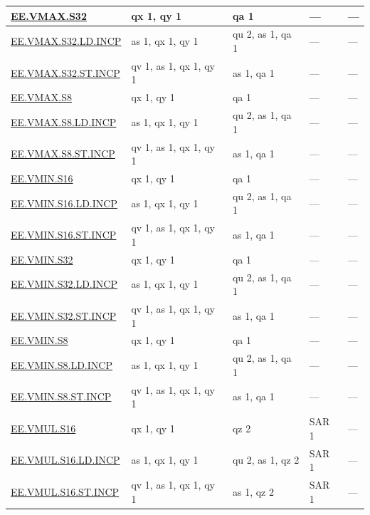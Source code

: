 \begin{longtable}[c]{|l|m{2.5cm}|m{2.5cm}|m{2.5cm}|m{2.5cm}|}
    \hyperref[instruction:EEVMAXS32]{EE.VMAX.S32} & qx 1, qy 1 & qa 1 & — & — \\\hline
    \hyperref[instruction:EEVMAXS32LDINCP]{EE.VMAX.S32.LD.INCP} & as 1, qx 1, qy 1 & qu 2, as 1, qa 1 & — & — \\\hline
    \hyperref[instruction:EEVMAXS32STINCP]{EE.VMAX.S32.ST.INCP} & qv 1, as 1, qx 1, qy 1 & as 1, qa 1 & — & — \\\hline
    \hyperref[instruction:EEVMAXS8]{EE.VMAX.S8} & qx 1, qy 1 & qa 1 & — & — \\\hline
    \hyperref[instruction:EEVMAXS8LDINCP]{EE.VMAX.S8.LD.INCP} & as 1, qx 1, qy 1 & qu 2, as 1, qa 1 & — & — \\\hline
    \hyperref[instruction:EEVMAXS8STINCP]{EE.VMAX.S8.ST.INCP} & qv 1, as 1, qx 1, qy 1 & as 1, qa 1 & — & — \\\hline
    \hyperref[instruction:EEVMINS16]{EE.VMIN.S16} & qx 1, qy 1 & qa 1 & — & — \\\hline
    \hyperref[instruction:EEVMINS16LDINCP]{EE.VMIN.S16.LD.INCP} & as 1, qx 1, qy 1 & qu 2, as 1, qa 1 & — & — \\\hline
    \hyperref[instruction:EEVMINS16STINCP]{EE.VMIN.S16.ST.INCP} & qv 1, as 1, qx 1, qy 1 & as 1, qa 1 & — & — \\\hline
    \hyperref[instruction:EEVMINS32]{EE.VMIN.S32} & qx 1, qy 1 & qa 1 & — & — \\\hline
    \hyperref[instruction:EEVMINS32LDINCP]{EE.VMIN.S32.LD.INCP} & as 1, qx 1, qy 1 & qu 2, as 1, qa 1 & — & — \\\hline
    \hyperref[instruction:EEVMINS32STINCP]{EE.VMIN.S32.ST.INCP} & qv 1, as 1, qx 1, qy 1 & as 1, qa 1 & — & — \\\hline
    \hyperref[instruction:EEVMINS8]{EE.VMIN.S8} & qx 1, qy 1 & qa 1 & — & — \\\hline
    \hyperref[instruction:EEVMINS8LDINCP]{EE.VMIN.S8.LD.INCP} & as 1, qx 1, qy 1 & qu 2, as 1, qa 1 & — & — \\\hline
    \hyperref[instruction:EEVMINS8STINCP]{EE.VMIN.S8.ST.INCP} & qv 1, as 1, qx 1, qy 1 & as 1, qa 1 & — & — \\\hline
    \hyperref[instruction:EEVMULS16]{EE.VMUL.S16} & qx 1, qy 1 & qz 2 & SAR 1 & — \\\hline
    \hyperref[instruction:EEVMULS16LDINCP]{EE.VMUL.S16.LD.INCP} & as 1, qx 1, qy 1 & qu 2, as 1, qz 2 & SAR 1 & — \\\hline
    \hyperref[instruction:EEVMULS16STINCP]{EE.VMUL.S16.ST.INCP} & qv 1, as 1, qx 1, qy 1 & as 1, qz 2 & SAR 1 & — \\\hline

\end{longtable}
